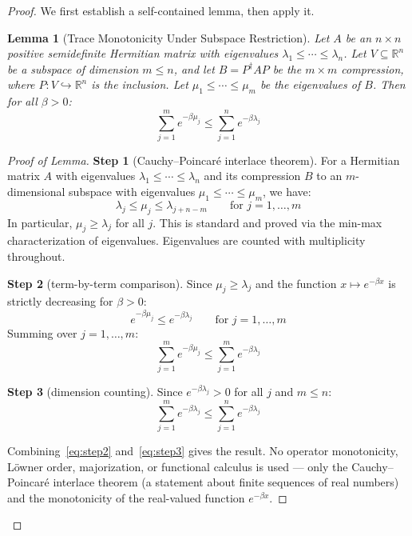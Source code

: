 \documentclass[11pt,letterpaper]{article}
\newtheorem{lemma}[conjecture]{Lemma}
\begin{document}
\begin{proof}
We first establish a self-contained lemma, then apply it.

\begin{lemma}[Trace Monotonicity Under Subspace 
Restriction]\label{lem:trace_mono}
Let $A$ be an $n \times n$ positive semidefinite Hermitian matrix 
with eigenvalues $\lambda_1 \leq \cdots \leq \lambda_n$. Let 
$V \subseteq \mathbb{R}^n$ be a subspace of dimension $m \leq n$, 
and let $B = P^\dagger A P$ be the $m \times m$ compression, where 
$P : V \hookrightarrow \mathbb{R}^n$ is the inclusion. Let 
$\mu_1 \leq \cdots \leq \mu_m$ be the eigenvalues of $B$. Then 
for all $\beta > 0$:
\[
    \sum_{j=1}^{m} e^{-\beta \mu_j} 
    \leq \sum_{j=1}^{n} e^{-\beta \lambda_j}
\]
\end{lemma}

\begin{proof}[Proof of Lemma]
\textbf{Step 1} (Cauchy--Poincar\'e interlace theorem). For a 
Hermitian matrix $A$ with eigenvalues 
$\lambda_1 \leq \cdots \leq \lambda_n$ and its compression $B$ 
to an $m$-dimensional subspace with eigenvalues 
$\mu_1 \leq \cdots \leq \mu_m$, we have:
\begin{equation}\label{eq:interlace_explicit}
    \lambda_j \leq \mu_j \leq \lambda_{j + n - m} 
    \qquad \text{for } j = 1, \ldots, m
\end{equation}
In particular, $\mu_j \geq \lambda_j$ for all $j$. This is 
standard and proved via the min-max characterization of eigenvalues. 
Eigenvalues are counted with multiplicity throughout.

\textbf{Step 2} (term-by-term comparison). Since $\mu_j \geq 
\lambda_j$ and the function $x \mapsto e^{-\beta x}$ is strictly 
decreasing for $\beta > 0$:
\[
    e^{-\beta \mu_j} \leq e^{-\beta \lambda_j} 
    \qquad \text{for } j = 1, \ldots, m
\]
Summing over $j = 1, \ldots, m$:
\begin{equation}\label{eq:step2}
    \sum_{j=1}^{m} e^{-\beta \mu_j} 
    \leq \sum_{j=1}^{m} e^{-\beta \lambda_j}
\end{equation}

\textbf{Step 3} (dimension counting). Since $e^{-\beta \lambda_j} 
> 0$ for all $j$ and $m \leq n$:
\begin{equation}\label{eq:step3}
    \sum_{j=1}^{m} e^{-\beta \lambda_j} 
    \leq \sum_{j=1}^{n} e^{-\beta \lambda_j}
\end{equation}

Combining~\eqref{eq:step2} and~\eqref{eq:step3} gives the result.
No operator monotonicity, L\"owner order, majorization, or 
functional calculus is used --- only the Cauchy--Poincar\'e 
interlace theorem (a statement about finite sequences of real 
numbers) and the monotonicity of the real-valued function 
$e^{-\beta x}$.
\end{proof}


\end{proof}
\end{document}
